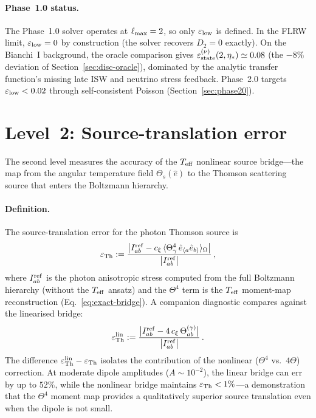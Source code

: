 \paragraph{Phase~1.0 status.}

The Phase~1.0 solver operates at $\ell_{\rm max} = 2$, so
only $\varepsilon_{\rm low}$ is defined.  In the FLRW
limit, $\varepsilon_{\rm low} = 0$ by construction (the
solver recovers $D_2 = 0$ exactly).  On the Bianchi~I
background, the oracle comparison gives
$\varepsilon_{\rm state}^{(\nu)}(2, \eta_*) \simeq 0.08$
(the $-8\%$ deviation of
Section~\ref{sec:disc-oracle}), dominated by the
analytic transfer function's missing late ISW and
neutrino stress feedback.  Phase~2.0 targets
$\varepsilon_{\rm low} < 0.02$ through self-consistent
Poisson (Section~\ref{sec:phase20}).


\section{Level~2: Source-translation error}
\label{sec:err-source}

The second level measures the accuracy of the $T_{\mathrm{eff}}$
nonlinear source bridge---the map from the angular
temperature field $\Theta_s(\hat{e})$ to the Thomson
scattering source that enters the Boltzmann hierarchy.


\paragraph{Definition.}

The source-translation error for the photon Thomson source is
\begin{equation}\label{eq:err-Th}
\varepsilon_{\rm Th}
:= \frac{
  \big|
    I_{ab}^{\rm ref}
    - c_\xi\,
      \langle \Theta_\gamma^4\,
      \hat{e}_{\langle a}\hat{e}_{b\rangle}
      \rangle_\Omega
  \big|
}{
  \big| I_{ab}^{\rm ref} \big|
}\,,
\end{equation}
where $I_{ab}^{\rm ref}$ is the photon anisotropic stress
computed from the full Boltzmann hierarchy (without the
$T_{\mathrm{eff}}$ ansatz) and the $\Theta^4$ term is the $T_{\mathrm{eff}}$
moment-map reconstruction
(Eq.~\ref{eq:exact-bridge}).  A companion diagnostic
compares against the linearised bridge:
\begin{equation}\label{eq:err-Th-lin}
\varepsilon_{\rm Th}^{\rm lin}
:= \frac{
  \big|
    I_{ab}^{\rm ref}
    - 4\,c_\xi\,\Theta^{(\gamma)}_{ab}
  \big|
}{
  \big| I_{ab}^{\rm ref} \big|
}\,.
\end{equation}
The difference
$\varepsilon_{\rm Th}^{\rm lin} - \varepsilon_{\rm Th}$
isolates the contribution of the nonlinear ($\Theta^4$
vs.\ $4\Theta$) correction.  At moderate dipole amplitudes
($A \sim 10^{-2}$), the linear bridge can err by up to
$52\%$, while the nonlinear bridge maintains
$\varepsilon_{\rm Th} < 1\%$---a demonstration that the
$\Theta^4$ moment map provides a qualitatively superior
source translation even when the dipole is not small.


